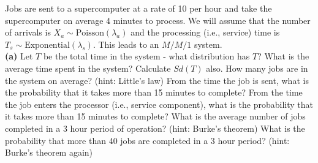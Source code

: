 

\item 
Jobs are sent to a supercomputer at a rate of 10 per hour and take the supercomputer on average 4 minutes to process. We will assume that the number of arrivals is $X_a \sim \text{Poisson}(\lambda_a)$ and the processing (i.e., service) time is $T_s \sim \text{Exponential}(\lambda_s)$. This leads to an $M/M/1$ system.\\[-0.2cm]

{\bf(a)} Let $T$ be the total time in the system - what distribution has $T$?  What is the average time spent in the system? Calculate $Sd(T)$ also.  How many jobs are in the system on average? (hint: Little's law)   From the time the job is sent, what is the probability that it takes more than 15 minutes to complete?   From the time the job enters the processor (i.e., service component), what is the probability that it takes more than 15 minutes to complete?  What is the average number of jobs completed in a 3 hour period of operation? (hint: Burke's theorem)  What is the probability that more than 40 jobs are completed in a 3 hour period? (hint: Burke's theorem again)



